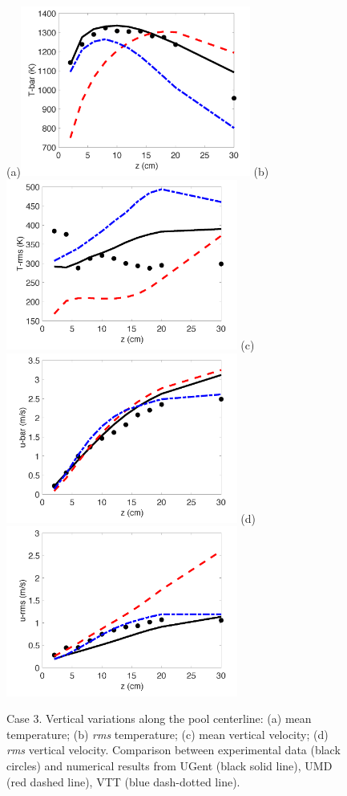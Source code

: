 \begin{figure}
\centering
(a)\includegraphics[height=2.2in]{Figures/Case3-Fig1a.png}
(b)\includegraphics[height=2.2in]{Figures/Case3-Fig1b.png}
(c)\includegraphics[height=2.2in]{Figures/Case3-Fig1c.png}
(d)\includegraphics[height=2.2in]{Figures/Case3-Fig1d.png}
\caption{Case 3. Vertical variations along the pool centerline: (a) mean temperature; (b) {\it rms} temperature; (c) mean vertical velocity; (d) {\it rms} vertical velocity. Comparison between experimental data (black circles) and numerical results from UGent (black solid line), UMD (red dashed line), VTT (blue dash-dotted line).}
\label{fig:Case3-Fig1}
\end{figure}

